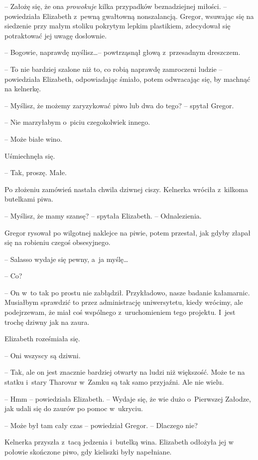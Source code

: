 \documentclass[oneside,polish,12pt,sfheadings]{mwbk}
\begin{document}
-- Założę się, że ona \emph{prowokuje } kilka przypadków beznadziejnej
miłości. -- powiedziała Elizabeth z~pewną gwałtowną nonszalancją. Gregor,
wsuwając się na siedzenie przy małym stoliku pokrytym lepkim plastikiem,
zdecydował się potraktować jej uwagę dosłownie.

-- Bogowie, naprawdę myślisz\ldots -- powtrząsnął głową z~przesadnym
dreszczem.

-- To nie bardziej szalone niż to, co robią naprawdę zamroczeni ludzie -- powiedziała Elizabeth, odpowiadając śmiało, potem odwracając się, by
machnąć na kelnerkę.

-- Myślisz, że możemy zaryzykować piwo lub dwa do tego? -- spytał Gregor.

-- Nie marzyłabym o~piciu czegokolwiek innego.

-- Może białe wino.

Uśmiechnęła się. 

-- Tak, proszę. Małe.

Po złożeniu zamówień nastała chwila dziwnej ciszy. Kelnerka wróciła z~kilkoma butelkami piwa.

-- Myślisz, że mamy szansę? -- spytała Elizabeth. -- Odnalezienia.

Gregor rysował po wilgotnej naklejce na piwie, potem przestał, jak gdyby
złapał się na robieniu czegoś obsesyjnego.

-- Salasso wydaje się pewny, a~ja myślę\ldots

-- Co?

-- On w~to tak po prostu nie zabłądził. Przykładowo, nasze badanie
kałamarnic. Musiałbym sprawdzić to przez administrację uniwersytetu,
kiedy wrócimy, ale podejrzewam, że miał coś wspólnego z~uruchomieniem
tego projektu. I~jest trochę dziwny jak na zaura.

Elizabeth roześmiała się. 

-- Oni wszyscy są dziwni.

-- Tak, ale on jest znacznie bardziej otwarty na ludzi niż większość.
Może te na statku i~stary Tharovar w~Zamku są tak samo przyjaźni. Ale
nie wielu.

-- Hmm -- powiedziała Elizabeth. -- Wydaje się, że wie dużo o~Pierwszej
Załodze, jak udali się do zaurów po pomoc w~ukryciu.

-- Może był tam cały czas -- powiedział Gregor. -- Dlaczego nie?

Kelnerka przyszła z~tacą jedzenia i~butelką wina. Elizabeth odłożyła jej
w połowie skończone piwo, gdy kieliszki były napełniane.
\end{document}
